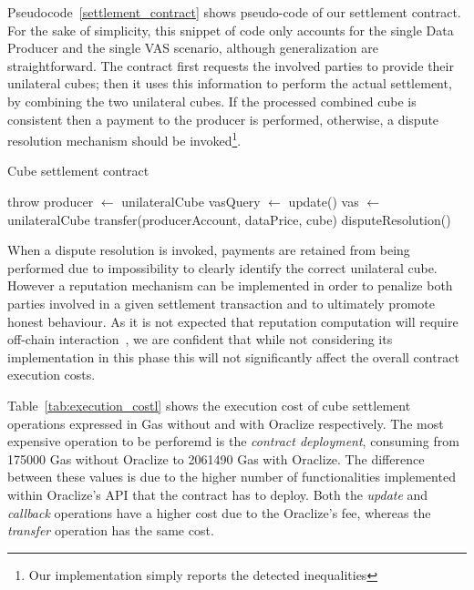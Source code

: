 Pseudocode~\ref{settlement_contract} shows pseudo-code of our settlement contract. For the sake of simplicity, this snippet of code only accounts for the single Data Producer and the single VAS scenario, although generalization are straightforward.
The contract first requests the involved parties to provide their unilateral cubes; then it uses this information to perform the actual settlement, by combining the two unilateral cubes. If the processed combined cube is consistent then a payment to the producer is performed, otherwise, a dispute resolution mechanism should be invoked\footnote{Our implementation simply reports the detected inequalities}.
%
\begin{algorithm}
	\caption{Cube settlement contract}\label{settlement_contract}
\begin{algorithmic}
	\STATE throw
	\STATE producer $\gets$ unilateralCube
	\STATE vasQuery $\gets$ update()
	\STATE vas $\gets$ unilateralCube
	\STATE transfer(producerAccount, dataPrice, cube)
	\ELSE
	\STATE disputeResolution()
	\ENDIF
	\ENDIF
	\ENDIF
\end{algorithmic}
\end{algorithm}
%
When a dispute resolution is invoked, payments are retained from being performed due to impossibility to clearly identify the correct unilateral cube. However a reputation mechanism can be implemented in order to penalize both parties involved in a given settlement transaction and to ultimately promote honest behaviour. As it is not expected that reputation computation will require off-chain interaction~\cite{schaub2016trustless,carboni2015feedback}, we are confident that while not considering its implementation in this phase this will not significantly affect the overall contract execution costs.

Table~\ref{tab:execution_costl} shows the execution cost of cube settlement operations expressed in Gas without and with Oraclize respectively. The most expensive operation to be perforemd is the \emph{contract deployment}, consuming from 175000 Gas without Oraclize to 2061490 Gas with Oraclize. The difference between these values is due to the higher number of functionalities implemented within Oraclize's API that the contract has to deploy. Both the \emph{update} and \emph{callback} operations have a higher cost due to the Oraclize's fee, whereas the \emph{transfer} operation has the same cost.

